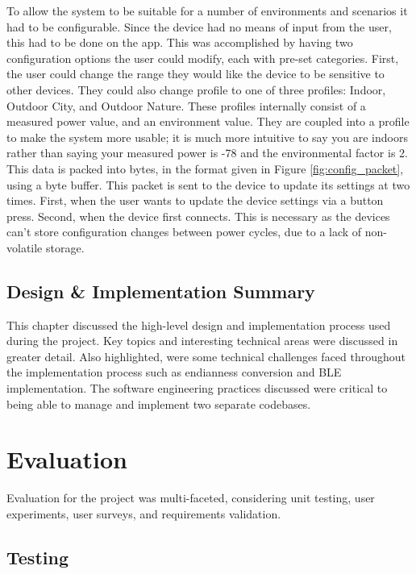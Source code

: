 \documentclass{l4proj}
\begin{document}
To allow the system to be suitable for a number of environments and scenarios it had to be configurable. Since the device had no means of input from the user, this had to be done on the app. This was accomplished by having two configuration options the user could modify, each with pre-set categories. First, the user could change the range they would like the device to be sensitive to other devices. They could also change profile to one of three profiles: Indoor, Outdoor City, and Outdoor Nature. These profiles internally consist of a measured power value, and an environment value. They are coupled into a profile to make the system more usable; it is much more intuitive to say you are indoors rather than saying your measured power is -78 and the environmental factor is 2. This data is packed into bytes, in the format given in Figure \ref{fig:config_packet}, using a byte buffer. This packet is sent to the device to update its settings at two times. First, when the user wants to update the device settings via a button press. Second, when the device first connects. This is necessary as the devices can't store configuration changes between power cycles, due to a lack of non-volatile storage.

\section{Design \& Implementation Summary}

This chapter discussed the high-level design and implementation process used during the project. Key topics and interesting technical areas were discussed in greater detail. Also highlighted, were some technical challenges faced throughout the implementation process such as endianness conversion and BLE implementation. The software engineering practices discussed were critical to being able to manage and implement two separate codebases.

\chapter{Evaluation}

Evaluation for the project was multi-faceted, considering unit testing, user experiments, user surveys, and requirements validation.

\section{Testing}
\end{document}
